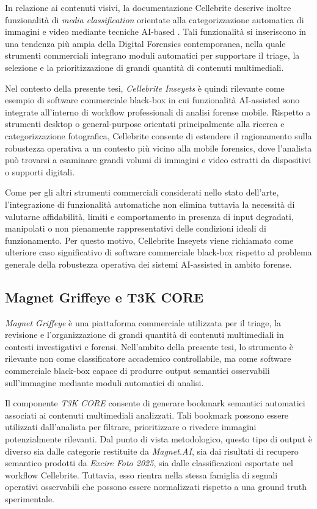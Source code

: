In relazione ai contenuti visivi, la documentazione Cellebrite descrive inoltre funzionalità di \textit{media classification} orientate alla categorizzazione automatica di immagini e video mediante tecniche AI-based \cite{cellebrite}. Tali funzionalità si inseriscono in una tendenza più ampia della Digital Forensics contemporanea, nella quale strumenti commerciali integrano moduli automatici per supportare il triage, la selezione e la prioritizzazione di grandi quantità di contenuti multimediali.

Nel contesto della presente tesi, \textit{Cellebrite Inseyets} è quindi rilevante come esempio di software commerciale black-box in cui funzionalità AI-assisted sono integrate all'interno di workflow professionali di analisi forense mobile. Rispetto a strumenti desktop o general-purpose orientati principalmente alla ricerca e categorizzazione fotografica, Cellebrite consente di estendere il ragionamento sulla robustezza operativa a un contesto più vicino alla mobile forensics, dove l'analista può trovarsi a esaminare grandi volumi di immagini e video estratti da dispositivi o supporti digitali.

Come per gli altri strumenti commerciali considerati nello stato dell'arte, l'integrazione di funzionalità automatiche non elimina tuttavia la necessità di valutarne affidabilità, limiti e comportamento in presenza di input degradati, manipolati o non pienamente rappresentativi delle condizioni ideali di funzionamento. Per questo motivo, Cellebrite Inseyets viene richiamato come ulteriore caso significativo di software commerciale black-box rispetto al problema generale della robustezza operativa dei sistemi AI-assisted in ambito forense.

\subsection{Magnet Griffeye e T3K CORE}
\label{subsec:sota_griffeye_t3k}

\textit{Magnet Griffeye} è una piattaforma commerciale utilizzata per il triage,
la revisione e l'organizzazione di grandi quantità di contenuti multimediali in
contesti investigativi e forensi. Nell'ambito della presente tesi, lo strumento
è rilevante non come classificatore accademico controllabile, ma come software
commerciale black-box capace di produrre output semantici osservabili
sull'immagine mediante moduli automatici di analisi.

Il componente \textit{T3K CORE} consente di generare bookmark semantici
automatici associati ai contenuti multimediali analizzati. Tali bookmark possono
essere utilizzati dall'analista per filtrare, prioritizzare o rivedere immagini
potenzialmente rilevanti. Dal punto di vista metodologico, questo tipo di output
è diverso sia dalle categorie restituite da \textit{Magnet.AI}, sia dai risultati
di recupero semantico prodotti da \textit{Excire Foto 2025}, sia dalle
classificazioni esportate nel workflow Cellebrite. Tuttavia, esso rientra nella
stessa famiglia di segnali operativi osservabili che possono essere normalizzati
rispetto a una ground truth sperimentale.

